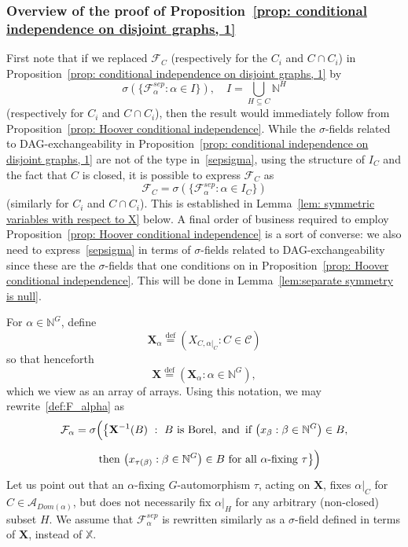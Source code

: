 \documentclass[10pt]{amsart}
\theoremstyle{definition}\newtheorem{defi}[theo]{Definition}\newtheorem{rema}[theo]{Remark}\newtheorem{exam}[theo]{Example}\newtheorem{exem}[theo]{Example}\newtheorem{nota}[theo]{Notation}
\newcommand{\alf}{\alpha}%
\newcommand*\bb{\beta}
\newcommand*{\defeq}{\stackrel{\mathrm{def}}{=}}
\newcommand*{\sep}{\mathit{sep}}
\newcommand*\dom{\mathit{Dom}}
\newcommand*\X{\mathbb{X}}
\newcommand*\N{\mathbb{N}}
\renewcommand{\AA}{\mathcal{A}}
\newcommand*\CC{{\mathcal{C}}}
\newcommand*\FF{\mathcal{F}}
\newcommand*\bX{\mathbf{X}}
\begin{document}

\subsubsection{Overview of the proof of Proposition~\ref{prop: conditional independence on disjoint graphs, 1}}

First note that if we replaced $\FF_C$ (respectively for the $C_i$ and $C\cap C_i$) in Proposition~\ref{prop: conditional independence on disjoint graphs, 1} by
\begin{equation}\label{sepsigma}
\sigma(\{\FF_\alf ^{\sep}:\alf\in I\}),\quad I=\bigcup_{H \subseteq C} \N^H
\end{equation}
(respectively for $C_i$ and $C\cap C_i$), then the result would immediately follow from Proposition~\ref{prop: Hoover conditional independence}. While the $\sigma$-fields related to DAG-exchangeability in Proposition~\ref{prop: conditional independence on disjoint graphs, 1} are not of the type in~\eqref{sepsigma}, using the structure of $I_C$ and the fact that $C$ is closed, it is possible to express $\FF_C$ as
\begin{equation}\label{sep dag rel}
\FF_C=\sigma(\{\FF_\alf ^{\sep}: \alf \in I_C\})
\end{equation}
(similarly for $C_i$ and $C\cap C_i$). This is established in Lemma~\ref{lem: symmetric variables with respect to X} below. A final order of business required to employ Proposition~\ref{prop: Hoover conditional independence} is a sort of converse: we also need to express~\eqref{sepsigma} in terms of $\sigma$-fields related to DAG-exchangeability since these are the $\sigma$-fields that one conditions on in Proposition~\ref{prop: Hoover conditional independence}. This will be done in Lemma~\ref{lem:separate symmetry is null}.

\vspace{3mm}

For $\alf \in \N^G$, define
\[
\bX_\alpha
\defeq (X_{C,\alf|_C}: C \in \CC)
\]
so that henceforth
\[
\bX
\defeq (\bX_\alf:\alf \in \N^G),
\]
which we view as an array of arrays.
Using this notation, we may rewrite~\eqref{def:F_alpha} as
\begin{multline}\label{eq: Faa2}
\mathcal{F}_\alf = \sigma\Big(\big\{\bX^{-1}(B)~:~
B \text{ is Borel,\, and\, }
\text{if } \big(x_{\bb} : {\bb}\in \N^G \big) \in B,
\\[0.5em]
\quad
\text{then } \big(x_{\tau(\bb)} : \bb \in \N^G \big) \in B
\text{ for all $\alf$-fixing }\tau
\big\}\Big)
\end{multline}
Let us point out that an $\alf$-fixing $G$-automorphism $\tau$, acting on $\bX$, fixes $\alf|_C$ for $C \in \AA_{\dom(\alf)}$, but does not necessarily fix $\alf|_H$ for any arbitrary (non-closed) subset $H$. We assume that $\FF_\alf^\sep$ is rewritten similarly as a $\sigma$-field defined in terms of $\bX$, instead of $\X$.
\end{document}
